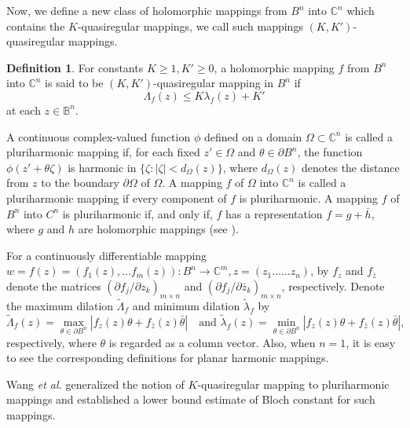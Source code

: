 \documentclass[a4paper,12pt,reqno]{amsart}
\theoremstyle{plain}
\theoremstyle{definition}
\newtheorem{defn}{Definition}[section]
\newcommand{\IC}{{\mathbb C}}
\numberwithin{equation}{section}
\begin{document}
Now, we define a new class of holomorphic mappings from $B^n$ into $\mathbb{C}^n$ which contains the $K$-quasiregular mappings, we call such mappings $\left(K, K'\right)$- quasiregular mappings.
\begin{defn}\label{Rohi-Vasu-P2-Definition-002}
For constants $K\geq1, K'\geq0$, a holomorphic mapping $f$ from $B^n$ into $\mathbb{C}^n$ is said to be $\left(K, K'\right)$-quasiregular mapping in $B^n$ if 
$$
\Lambda_f(z)\leq K\lambda_f(z)+K' 
$$
at each $z \in \mathbb{B}^n$.
\end{defn}
A continuous complex-valued function $\phi$ defined on a domain $\Omega \subset \IC^n$ is called a pluriharmonic mapping if, for each fixed $z'\in\Omega$ and $\theta \in \partial B^n$, the function $\phi\left(z'+\theta \zeta\right)$ is harmonic in $\{\zeta : |\zeta| < d_\Omega(z)\}$, where $d_\Omega(z)$ denotes the distance from $z$ to the boundary $\partial\Omega$ of $\Omega.$ A mapping $f$ of $\Omega$ into $\IC^n$ is called a pluriharmonic mapping if every component of $f$ is pluriharmonic. A mapping $f$ of $B^n$ into $C^n$ is pluriharmonic if, and only if, $f$ has a representation $f=g+\bar{h}$, where $g$ and $h$ are holomorphic mappings (see \cite{Rudin-1980}). 
\vspace{2mm}

For a continuously differentiable mapping $w=f(z)=\left(f_1(z), \ldots f_m(z)\right): B^n \rightarrow \mathbb{C}^m, z=\left(z_1 \ldots \ldots z_n\right)$, by $f_z$ and $f_{\bar{z}}$ denote the matrices $\left(\partial f_j / \partial z_k\right)_{m \times n}$ and $\left(\partial f_j / \partial \bar{z}_k\right)_{m \times n}$, respectively.
Denote the maximum dilation $\widetilde{\Lambda}_f$ and minimum dilation $\widetilde{\lambda}_f$ by
$$
\widetilde{\Lambda}_f(z)=\max _{\theta \in \partial B^n}\left|f_z(z) \theta+f_{\bar{z}}(z) \bar{\theta}\right|\quad\text{and }\widetilde{\lambda}_f(z)=\min _{\theta \in \partial B^n}\left|f_z(z) \theta+f_{\bar{z}}(z) \bar{\theta}\right|,
$$
respectively, where $\theta$ is regarded as a column vector. Also, when $n=1$, it is easy to see the corresponding definitions for planar harmonic mappings.
\vspace{2mm}

Wang {\it et al.} \cite{Wang-Yang-Liu-2022} generalized the notion of $K$-quasiregular mapping to pluriharmonic mappings and established a lower bound estimate of Bloch constant for such mappings.
\vspace{2mm}
\end{document}
